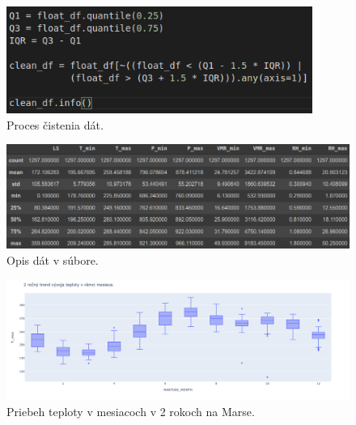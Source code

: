 \begin{figure}[!htbp]
  \centering
  \includegraphics[width=10cm]{img/clean_data.png}
  \caption{Proces čistenia dát.}
  \label{cleandf}
\end{figure}

\begin{figure}[!htbp]
  \centering
  \includegraphics[width=16cm]{img/df_desc.png}
  \caption{Opis dát v súbore.}
  \label{dfdesc}
\end{figure}

\begin{figure}[!htbp]
  \centering
  \includegraphics[width=16cm]{img/monthly_temp.png}
  \caption{Priebeh teploty v mesiacoch v 2 rokoch na Marse.}
  \label{dfdesc}
\end{figure}

